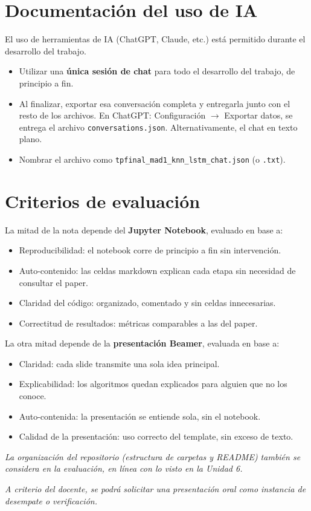 \documentclass[11pt,a4paper]{article}
\newcommand{\codigo}[1]{\texttt{#1}}
\begin{document}
\section{Documentaci\'on del uso de IA}
El uso de herramientas de IA (ChatGPT, Claude, etc.) est\'a permitido durante el desarrollo del trabajo.
\begin{itemize}[leftmargin=2em,itemsep=2pt]
    \item Utilizar una \textbf{\'unica sesi\'on de chat} para todo el desarrollo del trabajo, de principio a fin.
    \item Al finalizar, exportar esa conversaci\'on completa y entregarla junto con el resto de los archivos. En ChatGPT: Configuraci\'on $\rightarrow$ Exportar datos, se entrega el archivo \codigo{conversations.json}. Alternativamente, el chat en texto plano.
    \item Nombrar el archivo como \codigo{tpfinal\_mad1\_knn\_lstm\_chat.json} (o \codigo{.txt}).
\end{itemize}

\section{Criterios de evaluaci\'on}
La mitad de la nota depende del \textbf{Jupyter Notebook}, evaluado en base a:
\begin{itemize}[leftmargin=2em,itemsep=2pt]
    \item Reproducibilidad: el notebook corre de principio a fin sin intervenci\'on.
    \item Auto-contenido: las celdas markdown explican cada etapa sin necesidad de consultar el paper.
    \item Claridad del c\'odigo: organizado, comentado y sin celdas innecesarias.
    \item Correctitud de resultados: m\'etricas comparables a las del paper.
\end{itemize}

La otra mitad depende de la \textbf{presentaci\'on Beamer}, evaluada en base a:
\begin{itemize}[leftmargin=2em,itemsep=2pt]
    \item Claridad: cada slide transmite una sola idea principal.
    \item Explicabilidad: los algoritmos quedan explicados para alguien que no los conoce.
    \item Auto-contenida: la presentaci\'on se entiende sola, sin el notebook.
    \item Calidad de la presentaci\'on: uso correcto del template, sin exceso de texto.
\end{itemize}

\textit{La organizaci\'on del repositorio (estructura de carpetas y README) tambi\'en se considera en la evaluaci\'on, en l\'inea con lo visto en la Unidad 6.}

\textit{A criterio del docente, se podr\'a solicitar una presentaci\'on oral como instancia de desempate o verificaci\'on.}
\end{document}
